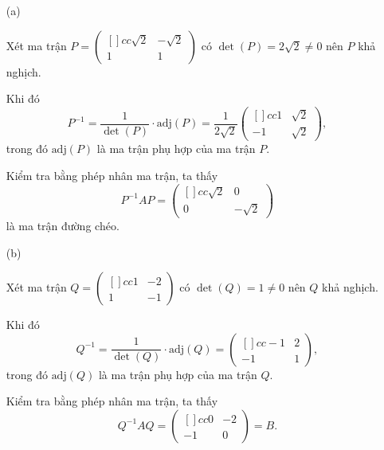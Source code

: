 \begin{enumerate}
    \item[(a)] {
        Xét ma trận $P = \begin{pmatrix}[]{cc}
            \sqrt{2} & -\sqrt{2} \\
            1 & 1
        \end{pmatrix}$ có $\det (P) = 2\sqrt{2} \ne 0$ nên $P$ khả nghịch.
        
        Khi đó $$P^{-1} = \dfrac{1}{\det (P)} \cdot \text{adj}(P) = \dfrac{1}{2\sqrt{2}}\begin{pmatrix}[]{cc}
            1 & \sqrt{2} \\
            -1 & \sqrt{2} 
        \end{pmatrix},$$ trong đó $\text{adj}(P)$ là ma trận phụ hợp của ma trận $P$. 

        Kiểm tra bằng phép nhân ma trận, ta thấy $$P^{-1}AP = \begin{pmatrix}[]{cc}
            \sqrt{2} & 0 \\
            0 & -\sqrt{2} 
        \end{pmatrix}$$ là ma trận đường chéo.
    }
    \item[(b)] {
        Xét ma trận $Q = \begin{pmatrix}[]{cc}
            1 & -2 \\ 
            1 & -1
        \end{pmatrix}$ có $\det (Q) = 1 \ne 0$ nên $Q$ khả nghịch.
        
        Khi đó $$Q^{-1} = \dfrac{1}{\det (Q)} \cdot \text{adj}(Q) = \begin{pmatrix}[]{cc}
            -1 & 2 \\
            -1 & 1
        \end{pmatrix},$$ trong đó $\text{adj}(Q)$ là ma trận phụ hợp của ma trận $Q$. 

        Kiểm tra bằng phép nhân ma trận, ta thấy $$Q^{-1}AQ = \begin{pmatrix}[]{cc}
            0 & -2 \\
            -1 & 0 
        \end{pmatrix} = B.$$
    } 
\end{enumerate}

